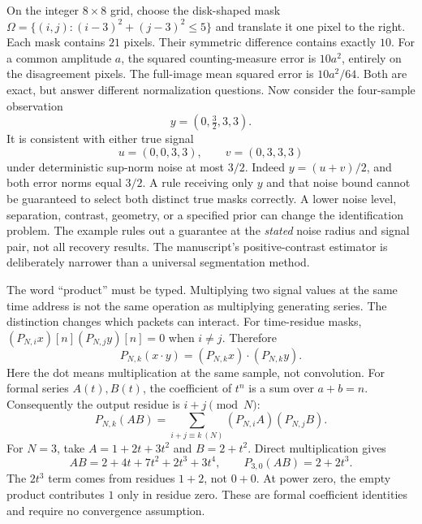 On the integer $8\times8$ grid, choose the disk-shaped mask
$\Omega=\{(i,j):(i-3)^2+(j-3)^2\le5\}$ and translate it one pixel to the right. Each mask contains $21$ pixels. Their symmetric difference contains exactly $10$.
For a common amplitude $a$, the squared counting-measure error is $10a^2$, entirely on the disagreement pixels. The full-image mean squared error is $10a^2/64$. Both are exact, but answer different normalization questions.
Now consider the four-sample observation
\[
y=(0,\tfrac32,3,3).
\]
It is consistent with either true signal
\[
u=(0,0,3,3),\qquad v=(0,3,3,3)
\]
under deterministic sup-norm noise at most $3/2$. Indeed $y=(u+v)/2$, and both error norms equal $3/2$. A rule receiving only $y$ and that noise bound cannot be guaranteed to select both distinct true masks correctly.
A lower noise level, separation, contrast, geometry, or a specified prior can change the identification problem. The example rules out a guarantee at the \emph{stated} noise radius and signal pair, not all recovery results. The manuscript's positive-contrast estimator is deliberately narrower than a universal segmentation method.

The word ``product'' must be typed. Multiplying two signal values at the same time address is not the same operation as multiplying generating series. The distinction changes which packets can interact.
For time-residue masks, $(P_{N,i}x)[n](P_{N,j}y)[n]=0$ when $i\ne j$. Therefore
\[
P_{N,k}(x\cdot y)=(P_{N,k}x)\cdot(P_{N,k}y).
\]
Here the dot means multiplication at the same sample, not convolution.
For formal series $A(t),B(t)$, the coefficient of $t^n$ is a sum over $a+b=n$. Consequently the output residue is $i+j\pmod N$:
\[
P_{N,k}(AB)=\sum_{i+j\equiv k\ (N)}(P_{N,i}A)(P_{N,j}B).
\]
For $N=3$, take $A=1+2t+3t^2$ and $B=2+t^2$. Direct multiplication gives
\[
AB=2+4t+7t^2+2t^3+3t^4,
\qquad P_{3,0}(AB)=2+2t^3.
\]
The $2t^3$ term comes from residues $1+2$, not $0+0$. At power zero, the empty product contributes $1$ only in residue zero. These are formal coefficient identities and require no convergence assumption.


